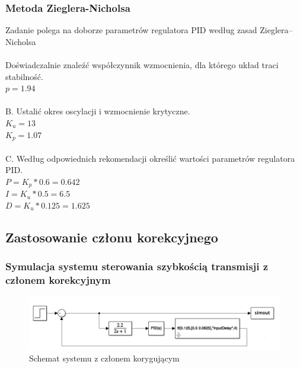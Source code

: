 \documentclass[a4paper,10pt]{article}
\begin{document}
\subsubsection{Metoda Zieglera-Nicholsa}\label{sec:Mzn}
Zadanie polega na doborze parametrów regulatora PID według zasad Zieglera–
Nicholsa\\ \\
Doświadczalnie znaleźć współczynnik wzmocnienia, dla którego układ traci
stabilność. \\
$p=1.94$\\ \\
B. Ustalić okres oscylacji i wzmocnienie krytyczne.\\
$K_u=13$\\
$K_p=1.07$\\ \\
C. Według odpowiednich rekomendacji określić wartości parametrów regulatora PID. \\		
$P= K_p*0.6 = 0.642$ \\
$I= K_u*0.5 = 6.5$ \\
$D= K_u*0.125 = 1.625$ \\

\subsection{Zastosowanie członu korekcyjnego}\label{sec:zad1_P}

\subsubsection{Symulacja systemu sterowania szybkością transmisji z członem korekcyjnym}

\begin{figure}[!h]
	\centering
	\includegraphics[width=120mm]{schemat_kor.png}
	\caption{Schemat systemu z członem korygującym}
	\label{fig:Wykres 7}
\end{figure}

\newpage
\end{document}
